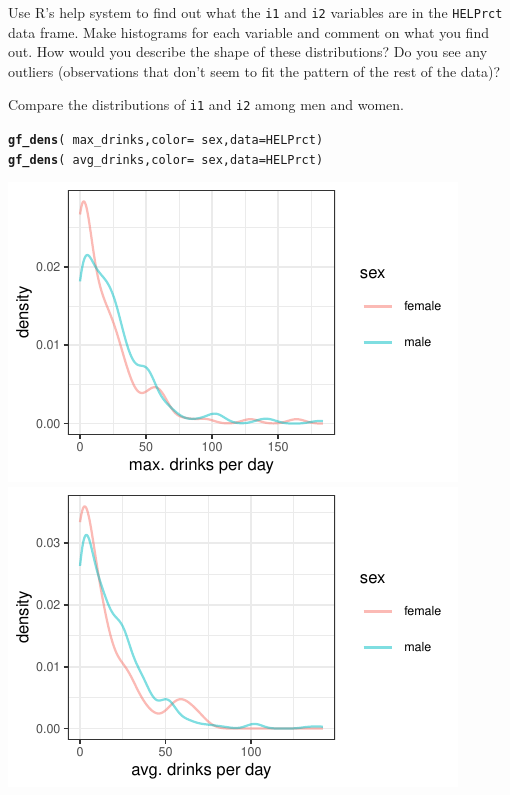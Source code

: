 \documentclass[twoside]{book}\usepackage[]{graphicx}\usepackage[]{xcolor}
\makeatletter
\def\maxwidth{ %
  \ifdim\Gin@nat@width>\linewidth
    \linewidth
  \else
    \Gin@nat@width
  \fi
}
\newcommand{\hlopt}[1]{\textcolor[rgb]{0,0,0}{#1}}%
\newcommand{\hlstd}[1]{\textcolor[rgb]{0.345,0.345,0.345}{#1}}%
\newcommand{\hlkwc}[1]{\textcolor[rgb]{0.333,0.667,0.333}{#1}}%
\newcommand{\hlkwd}[1]{\textcolor[rgb]{0.737,0.353,0.396}{\textbf{#1}}}%
\newenvironment{kframe}{%
 \def\at@end@of@kframe{}%
 \ifinner\ifhmode%
  \def\at@end@of@kframe{\end{minipage}}%
  \begin{minipage}{\columnwidth}%
 \fi\fi%
 \def\FrameCommand##1{\hskip\@totalleftmargin \hskip-\fboxsep
 \colorbox{shadecolor}{##1}\hskip-\fboxsep
     \hskip-\linewidth \hskip-\@totalleftmargin \hskip\columnwidth}%
 \MakeFramed {\advance\hsize-\width
   \@totalleftmargin\z@ \linewidth\hsize
   \@setminipage}}%
 {\par\unskip\endMakeFramed%
 \at@end@of@kframe}
\newenvironment{knitrout}{}{} %
\newcommand{\variable}[1]{{\color{green!50!black}\texttt{#1}}}
\newcommand{\Rindex}[1]{\index{\texttt{#1}}}
\newcommand{\dataframe}[1]{{\color{blue!80!black}\texttt{#1}}\Rindex{#1}}
\def\R{{\sf R}}
\makeatother
\begin{document}
\begin{problem}
	Use \R's help system to find out what the \variable{i1} and \variable{i2}
	variables are in the \dataframe{HELPrct} data frame.  Make histograms
	for each variable and comment on what you find out.  How would you describe
	the shape of these distributions?  Do you see any outliers (observations
	that don't seem to fit the pattern of the rest of the data)?  
\end{problem}
\begin{problem}
	Compare the distributions of \variable{i1} and \variable{i2} among men
	and women.
\end{problem}
\begin{solution}
\begin{knitrout}
\color{fgcolor}\begin{kframe}
\begin{alltt}
\hlkwd{gf_dens}\hlstd{(} \hlopt{~}\hlstd{max_drinks,} \hlkwc{color} \hlstd{=} \hlopt{~} \hlstd{sex,} \hlkwc{data} \hlstd{= HELPrct )}
\hlkwd{gf_dens}\hlstd{(} \hlopt{~}\hlstd{avg_drinks,} \hlkwc{color} \hlstd{=} \hlopt{~} \hlstd{sex,} \hlkwc{data} \hlstd{= HELPrct )}
\end{alltt}
\end{kframe}

{\centering \includegraphics[width=\maxwidth]{figures/fig-unnamed-chunk-26-1} 
\includegraphics[width=\maxwidth]{figures/fig-unnamed-chunk-26-2} 

}



\end{knitrout}
\end{solution}
\end{document}
